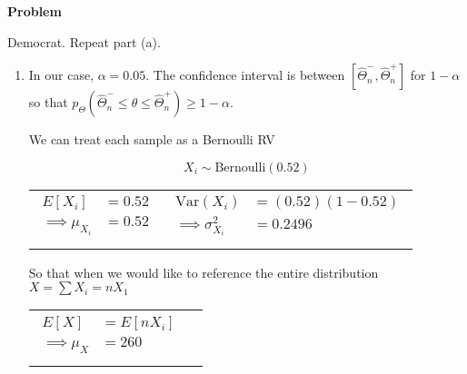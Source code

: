 \documentclass[12pt]{article}
\newenvironment{Ex}{\textbf{Problem}\vspace{.75em}\\}{}
\begin{document}
\begin{enumerate}
\begin{Ex}
\begin{enumerate}
      Democrat. Repeat part (a).
    \end{enumerate}
    \begin{solution} \hfill
      \begin{enumerate}
      \item In our case, $\alpha = 0.05$. The confidence interval is
        between $[\hat{\Theta}_n^{-}, \hat{\Theta}_n^{+}]$ for
        $1-\alpha$ so that $p_{\Theta}(\hat{\Theta}_n^{-} \le \theta
        \le \hat{\Theta}_n^{+}) \ge 1-\alpha$.

        We can treat each sample as a Bernoulli RV
        \begin{table}[H]
          \begin{equation}
            \label{eq:5a-rv}
            X_i\sim\text{Bernoulli}(0.52)
          \end{equation}
          \begin{tabularx}{\linewidth}{XX}
            \begin{equation}
              \label{eq:5a-mean}
              \begin{aligned}
                E[X_i] &= 0.52 \\
                \implies \mu_{X_i} &= 0.52 \\
              \end{aligned}
            \end{equation}
            &
            \begin{equation}
              \label{eq:5a-var}
              \begin{aligned}
                \text{Var}(X_i) &= (0.52)(1-0.52) \\
                \implies \sigma_{X_i}^2 &= 0.2496 \\
              \end{aligned}
            \end{equation}
          \end{tabularx}
        \end{table}
        So that when we would like to reference the entire
        distribution $X=\sum X_i = n X_1$
        \begin{table}[H]
          \begin{tabularx}{\linewidth}{XX}
            \begin{equation}
              \label{eq:5a-mean-x}
              \begin{aligned}
                E[X] &= E[n X_i] \\
                \implies \mu_{X} &= 260 \\

\end{aligned}
\end{equation}
\end{tabularx}
\end{table}
\end{enumerate}
\end{solution}
\end{Ex}
\end{enumerate}
\end{document}
